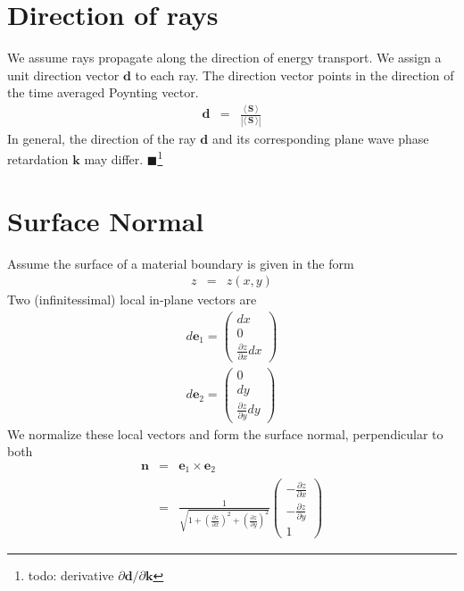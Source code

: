 \documentclass[12pt,a4paper,twoside,openright,BCOR10mm,headsepline,titlepage,abstracton,chapterprefix,final]{scrreprt}
\newcommand\Vector[1]{{\mathbf{#1}}}
\newcommand\wavenumber{k}
\newcommand\Wavevector{\Vector{\wavenumber}}
\newcommand{\timeavg}[1]{{\langle\,#1\,\rangle}}
\newcommand{\remark}[1]{{\color{red}$\blacksquare$}\footnote{{\color{red}#1}}}
\begin{document}
\section{Direction of rays}
We assume rays propagate along the direction of energy transport.
We assign a unit direction vector $\Vector{d}$ to each ray.
The direction vector points in the direction of the time averaged Poynting vector.
\begin{eqnarray}
 \Vector{d} &=& \frac{\timeavg{\Vector{S}}}{|\timeavg{\Vector{S}}|}
\end{eqnarray}
In general, the direction of the ray $\Vector{d}$ and its corresponding plane wave phase retardation $\Vector{k}$ may differ.
\remark{todo: derivative $\partial \Vector{d} /\partial \Wavevector$}

\section{Surface Normal}
Assume the surface of a material boundary is given in the form
\begin{eqnarray}
 z &=& z(x,y)
\end{eqnarray}
Two (infinitessimal) local in-plane vectors are 
\begin{eqnarray}
d\Vector{e}_1 = \begin{pmatrix}
                 dx \\ 0 \\ \frac{\partial z}{\partial x} dx
                \end{pmatrix}
\\
d\Vector{e}_2 = \begin{pmatrix}
                 0 \\ dy \\ \frac{\partial z}{\partial y} dy
                \end{pmatrix}
\end{eqnarray}
We normalize these local vectors and form the surface normal, perpendicular to both
\begin{eqnarray}
 \Vector{n} &=& \Vector{e}_1 \times \Vector{e}_2 \\
 &=& 
   \frac{1}{\sqrt{ 1 + \left( \frac{\partial z}{\partial x} \right)^2 + \left( \frac{\partial z}{\partial y} \right)^2 }}
   \begin{pmatrix}
    - \frac{\partial z}{\partial x} \\ - \frac{\partial z}{\partial y} \\ 1
   \end{pmatrix}
\end{eqnarray}
\end{document}
